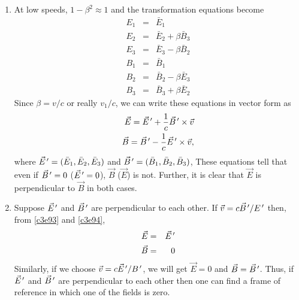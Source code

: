 \begin{enumerate}
\item At low speeds, $1 - \beta^2 \approx 1$ and the transformation equations
become
\begin{eqnarray}
E_1 &=& \bar{E}_1 \\ \label{c3e87}
E_2 &=& \bar{E}_2 + \beta\bar{B}_3 \\ \label{c3e88}
E_3 &=& \bar{E}_3 - \beta\bar{B}_2 \\ \label{c3e89}
B_1 &=& \bar{B}_1 \\ \label{c3e90}
B_2 &=& \bar{B}_2 - \beta\bar{E}_3 \\ \label{c3e92}
B_3 &=& \bar{B}_3 + \beta\bar{E}_2 \label{c3e93}
\end{eqnarray}
Since $\beta = v/c$ or really $v_1/c$, we can write these equations in vector form as
\begin{eqnarray}
\vec{E} = \vec{E}^{\,\prime} + \frac{1}{c}\vec{B}^{\,\prime} \times \vec{v} \label{c3e94} \\
\vec{B} = \vec{B}^{\,\prime} - \frac{1}{c}\vec{E}^{\,\prime} \times \vec{v}, \label{c3e95}
\end{eqnarray}
where $\vec{E}^{\,\prime} = (\bar{E}_1, \bar{E}_2, \bar{E}_3)$ and $\vec{B}^{\,\prime} = 
(\bar{B}_1, \bar{B}_2, \bar{B}_3)$, These equations tell that even if $\vec{B}^{\,\prime}
= 0$ ($\vec{E}^{\,\prime} = 0$), $\vec{B}$ ($\vec{E}$) is not. Further, it is clear that
$\vec{E}$ is perpendicular to $\vec{B}$ in both cases.

\item Suppose $\vec{E}^{\,\prime}$ and $\vec{B}^{\,\prime}$ are perpendicular to each other.
If $\vec{v} = c\vec{B}^{\,\prime}/E^{\,\prime}$ then, from \eqref{c3e93} and \eqref{c3e94},
\begin{eqnarray}
\vec{E} &=& \vec{E}^{\,\prime} \label{c3e96} \\
\vec{B} &=& 0 \label{c3e97}
\end{eqnarray}
Similarly, if we choose $\vec{v} = c\vec{E}^{\,\prime}/B^{\,\prime}$, we will get $\vec{E} = 0$
and $\vec{B} = \vec{B}^{\,\prime}$. Thus, if $\vec{E}^{\,\prime}$ and $\vec{B}^{\,\prime}$ are 
perpendicular to each other then one can find a frame of reference in which one
of the fields is zero.


\end{enumerate}
